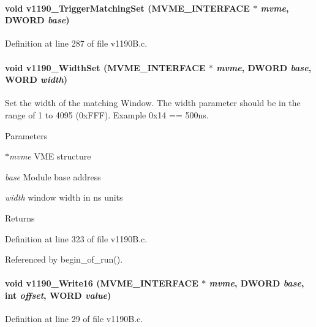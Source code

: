 \paragraph[{v1190\_\-TriggerMatchingSet}]{\setlength{\rightskip}{0pt plus 5cm}void v1190\_\-TriggerMatchingSet ({\bf MVME\_\-INTERFACE} $\ast$ {\em mvme}, \/  {\bf DWORD} {\em base})}\hfill\label{v1190B_8h_a71a62eeb00aaef0cdc4868d87e21e0ac}


Definition at line 287 of file v1190B.c.
\paragraph[{v1190\_\-WidthSet}]{\setlength{\rightskip}{0pt plus 5cm}void v1190\_\-WidthSet ({\bf MVME\_\-INTERFACE} $\ast$ {\em mvme}, \/  {\bf DWORD} {\em base}, \/  {\bf WORD} {\em width})}\hfill\label{v1190B_8h_af9175bc6e8cd2dc1c63dbd69d974f8a1}
Set the width of the matching Window. The width parameter should be in the range of 1 to 4095 (0xFFF). Example 0x14 == 500ns. 
\begin{DoxyParams}{Parameters}
\item[{\em $\ast$mvme}]VME structure \item[{\em base}]Module base address \item[{\em width}]window width in ns units \end{DoxyParams}
\begin{DoxyReturn}{Returns}

\end{DoxyReturn}


Definition at line 323 of file v1190B.c.

Referenced by begin\_\-of\_\-run().
\paragraph[{v1190\_\-Write16}]{\setlength{\rightskip}{0pt plus 5cm}void v1190\_\-Write16 ({\bf MVME\_\-INTERFACE} $\ast$ {\em mvme}, \/  {\bf DWORD} {\em base}, \/  int {\em offset}, \/  {\bf WORD} {\em value})}\hfill\label{v1190B_8h_a19faae61239fb361fbc9b875368e6091}


Definition at line 29 of file v1190B.c.